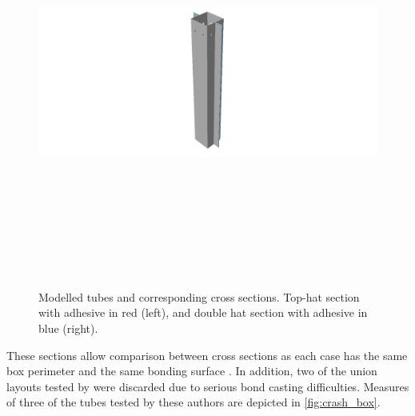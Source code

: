 \documentclass[
documentsize = a4, %
font = cmr, %
typesize = 11, %
printmode = true,
onehalfspacing = true,
language = en, %
titlepage = udciccp, %
degree = pt, %
dedication = true,
acknowledgements = true,
abstract-en = true,
abstract-es = false,
abstract-ga = false,
epigraphs = true,
toc = true,
lof = true,
lot = true,
frontmatterintoc = false,
notation = false,
minimal = false,
]{UDCthesis}
\begin{document}
\begin{figure}
\begin{minipage}[b]{.4\linewidth}
\end{minipage}
\hfill
\begin{minipage}[b]{.4\linewidth}
	\centering
	\includegraphics[height=135mm]{IMG_CUTRES/B_tube}
\end{minipage}

	\caption[Modelled tubes and corresponding cross sections.]{Modelled tubes and corresponding cross sections. Top-hat section with adhesive in red (left), and double hat section with adhesive in blue (right).}
	\label{fig:tubes}
\end{figure}

These sections allow comparison between cross sections as each case has the same box perimeter and the same bonding surface \citep{Peroni2009}. In addition, two of the union layouts tested by \citet{Peroni2009} were discarded due to serious bond casting difficulties. Measures of three of the tubes tested by these authors are depicted in \cref{fig:crash_box}.
\end{document}
